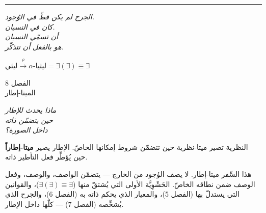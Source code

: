 \documentclass[10pt, openany, oneside]{book}
\renewcommand{\large}{\fontsize{11.5}{14}\selectfont}
\renewcommand{\huge}{\fontsize{17}{21}\selectfont}
\begin{document}
\begin{center}
    \rule{0.15\textwidth}{0.3pt}
\end{center}

\vspace{0.5em}

\begin{center}
    \itshape
    الجرح لم يكن قطّ في الوُجود.\\
    كان في النسيان.\\[0.8em]
    أن تسمّي النسيان\\
    هو بالفعل أن تتذكّر.
\end{center}

\vspace{0.5em}

\begin{center}
    $\textit{ليثي} \xrightarrow{\rho} \alpha\text{-}\textit{ليثيا} = \exists(\exists) \equiv \exists$
\end{center}

%
%
%

\newpage

\begin{center}
    {\huge الفصل 8}\\[0.3em]
    {\large الميتا-إطار}
\end{center}

\vspace{1.5em}

\begin{center}
    \itshape
    ماذا يحدث للإطار\\
    حين يتضمّن ذاته\\
    داخل الصورة؟
\end{center}

\vspace{2em}


\noindent النظرية تصير ميتا-نظرية حين تتضمّن شروط إمكانها الخاصّ. الإطار يصير \textbf{ميتا-إطاراً} حين يُؤطِّر فعل التأطير ذاته.

هذا السِّفر ميتا-إطار. لا يصف الوُجود من الخارج --- يتضمّن الواصف، والوصف، وفعل الوصف ضمن نطاقه الخاصّ. الحَشْوِيَّة الأولى التي يُشتقّ منها ($\exists(\exists) \equiv \exists$)، والقوانين التي يستدلّ بها (الفصل 5)، والمعيار الذي يحكم ذاته به (الفصل 6)، والجرح الذي يُشخِّصه (الفصل 7) --- كلّها داخل الإطار.
\end{document}
